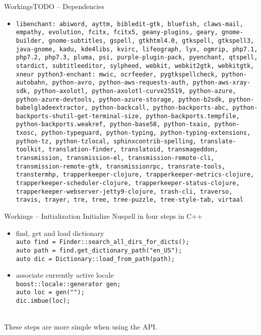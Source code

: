 \documentclass{beamer}
\begin{document}
\begin{frame}{WorkingsTODO – Dependencies}
\begin{itemize}
\item \tiny \texttt{\alert{libenchant}: abiword, ayttm, bibledit-gtk, bluefish, claws-mail, empathy, evolution, fcitx, fcitx5, geany-plugins, geary, gnome-builder, gnome-subtitles, gspell, gtkhtml4.0, gtkspell, gtkspell3, java-gnome, kadu, kde4libs, kvirc, lifeograph, lyx, ogmrip, php7.1, php7.2, php7.3, pluma, psi, purple-plugin-pack, pyenchant, qtspell, stardict, subtitleeditor, sylpheed, webkit, webkit2gtk, webkitgtk, xneur
python3-enchant: mwic, ocrfeeder, pygtkspellcheck, python-autobahn, python-avro, python-aws-requests-auth, python-aws-xray-sdk, python-axolotl, python-axolotl-curve25519, python-azure, python-azure-devtools, python-azure-storage, python-b2sdk, python-babelgladeextractor, python-backcall, python-backports-abc, python-backports-shutil-get-terminal-size, python-backports.tempfile, python-backports.weakref, python-base58, python-txaio, python-txosc, python-typeguard, python-typing, python-typing-extensions, python-tz, python-tzlocal, sphinxcontrib-spelling, translate-toolkit, translation-finder, translatoid, transmageddon, transmission, transmission-el, transmission-remote-cli, transmission-remote-gtk, transmissionrpc, transrate-tools, transtermhp, trapperkeeper-clojure, trapperkeeper-metrics-clojure, trapperkeeper-scheduler-clojure, trapperkeeper-status-clojure, trapperkeeper-webserver-jetty9-clojure, trash-cli, traverso, travis, trayer, tre, tree, tree-puzzle, tree-style-tab, virtaal}
\end{itemize}
\end{frame}



\begin{frame}{Workings – Initialization}
Initialize Nuspell in four steps in C++\\\mbox{}
\begin{itemize}
\item find, get and load dictionary\\
\texttt{auto find = Finder::\alert{search\_all\_dirs\_for\_dicts}();\\
auto path = find.\alert{get\_dictionary\_path}("en\_US");\\
auto dic = Dictionary::\alert{load\_from\_path}(path);}
\\\mbox{}
\item associate currently active locale\\
\texttt{boost::locale::generator gen;\\
auto loc = gen("");\\
dic.\alert{imbue}(loc);}
\end{itemize}
\mbox{}\\
These steps are more simple when using the API.
\end{frame}
\end{document}
